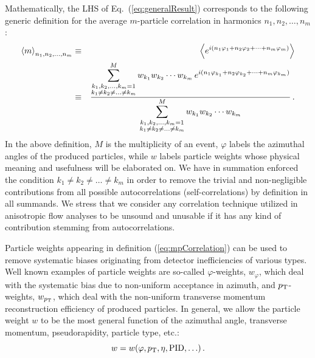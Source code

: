 \documentclass[12pt]{article}
\begin{document}
Mathematically, the LHS of Eq.~(\ref{eq:generalResult}) corresponds to the following generic definition for the average $m$-particle correlation in harmonics $n_1,n_2,\ldots,n_m$:
%
\begin{eqnarray}
\left<m\right>_{n_1,n_2,\ldots,n_m}&\equiv&\left<e^{i(n_1\varphi_{1}+n_2\varphi_{2}+\cdots+n_m\varphi_{m})}\right>\nonumber\\
&\equiv&\frac{\displaystyle\sum_{\begin{subarray}{c}k_1,k_2,\ldots,k_m=1\\k_1\neq k_2\neq \ldots\neq k_m\end{subarray}}^{M}w_{k_1}w_{k_2}\cdots w_{k_m}\,e^{i(n_1\varphi_{k_1}+n_2\varphi_{k_2}+\cdots+n_m\varphi_{k_m})}}{\displaystyle\sum_{\begin{subarray}{c}k_1,k_2,\ldots,k_m=1\\k_1\neq k_2\neq \ldots\neq k_m\end{subarray}}^{M} w_{k_1}w_{k_2}\cdots w_{k_m}}\,.
\label{eq:mpCorrelation}
\end{eqnarray}
%  
In the above definition, $M$ is the multiplicity of an event, $\varphi$ labels the azimuthal angles of the produced particles, while $w$ labels particle weights whose physical meaning and usefulness will be elaborated on. We have in summation enforced the condition $k_1\neq k_2\neq \ldots\neq k_m$ in order to remove the trivial and non-negligible contributions from all possible autocorrelations (self-correlations) by definition in all summands. We stress that we consider any correlation technique utilized in anisotropic flow analyses to be unsound and unusable if it has any kind of contribution stemming from autocorrelations.  

Particle weights appearing in definition (\ref{eq:mpCorrelation}) can be used to remove systematic biases originating from detector inefficiencies of various types. Well known examples of particle weights are so-called $\varphi$-weights, $w_{\varphi}$, which deal with the systematic bias due to non-uniform acceptance in azimuth, and $p_{\rm T}$-weights, $w_{p_{\rm T}}$, which deal with the non-uniform transverse momentum reconstruction efficiency of produced particles. In general, we allow the particle weight $w$ to be the most general function of the azimuthal angle, transverse momentum, pseudorapidity, particle type, etc.:
%
\begin{equation}
w = w(\varphi,p_{{\rm T}},\eta,{\rm PID},\ldots)\,.
\label{eq:generalParticleWeights}
\end{equation}
%   
\end{document}
